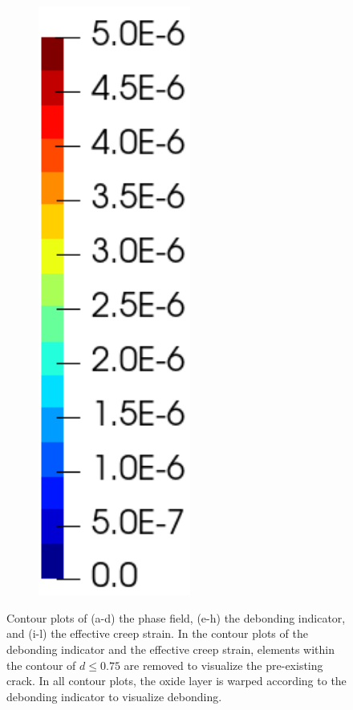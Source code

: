 \begin{figure}[!htb]
\begin{subfigure}[b]{0.1\textwidth}
    \includegraphics[width=0.55\textwidth]{Chapter5/figures/spallation/colorbar_ep}
    \vspace{3em}
  \end{subfigure}
  \caption[Simulation of debonding with a pre-existing crack.]{Contour plots of (a-d) the phase field, (e-h) the debonding indicator, and (i-l) the effective creep strain. In the contour plots of the debonding indicator and the effective creep strain, elements within the contour of $d \leqslant 0.75$ are removed to visualize the pre-existing crack. In all contour plots, the oxide layer is warped according to the debonding indicator to visualize debonding. }
  \label{fig: Chapter5/spallation/animation_seed}
\end{figure}
